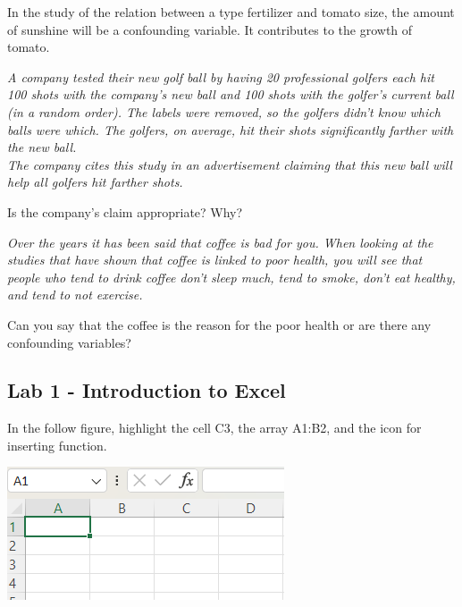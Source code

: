 \begin{example}
  In the study of the relation between a type
  fertilizer and tomato size, the amount of sunshine will be a
  confounding variable. It contributes to the growth of tomato.
\end{example}
\vspace*{2\baselineskip}

\begin{exercise}
  \textit{A company tested their new golf ball by having 20 professional golfers
  each hit 100 shots with the company's new ball and 100 shots with the golfer's current ball (in a random order). The labels were removed, so the golfers didn't know which balls were which. The golfers, on average, hit their shots significantly farther with the new ball.\\  
  The company cites this study in an advertisement claiming that this new
  ball will help all golfers hit farther shots.}
  
  Is the company's claim appropriate? Why?
\end{exercise}
\vspace*{2\baselineskip}

\begin{exercise}
  \textit{Over the years it has been said that coffee is bad for you. When looking at the studies that have shown that coffee is linked to poor health, you will see that people who tend to drink coffee don't sleep much, tend to smoke, don't eat healthy, and tend to not exercise.} 
  
  Can you say that the coffee is the reason for the poor health or are there any confounding variables?
\end{exercise}
\vspace*{5\baselineskip}

\subsection{Lab 1 - Introduction to Excel}

\begin{exercise}
  In the follow figure, highlight the cell C3, the array A1:B2, and the icon for inserting function.

  \centerline{
    \includegraphics[scale=0.8]{Figures/Excel-CellLocator-Function.png}
  }
\end{exercise}

